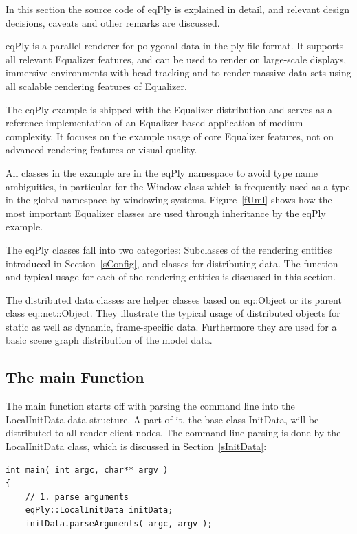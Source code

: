 \documentclass[10pt,a4]{scrartcl}
\newcommand{\fig}[1]{Figure~\ref{#1}}
\newcommand{\sref}[1]{Section~\ref{#1}}
\begin{document}
In this section the source code of \textsf{eqPly} is explained in
detail, and relevant design decisions, caveats and other remarks are
discussed.

\textsf{eqPly} is a parallel renderer for polygonal data in the
\textsf{ply} file format. It supports all relevant Equalizer features,
and can be used to render on large-scale displays, immersive
environments with head tracking and to render massive data sets using
all scalable rendering features of Equalizer.

The \textsf{eqPly} example is shipped with the Equalizer distribution
and serves as a reference implementation of an Equalizer-based
application of medium complexity. It focuses on the example usage of
core Equalizer features, not on advanced rendering features or visual
quality.

All classes in the example are in the \textsf{eqPly} namespace to avoid
type name ambiguities, in particular for the \textsf{Window} class which
is frequently used as a type in the global namespace by windowing
systems. \fig{fUml} shows how the most important Equalizer classes are
used through inheritance by the \textsf{eqPly} example.

The \textsf{eqPly} classes fall into two categories: Subclasses of the
rendering entities introduced in \sref{sConfig}, and classes for
distributing data. The function and typical usage for each of the
rendering entities is discussed in this section.

The distributed data classes are helper classes based on
\textsf{eq::Object} or its parent class \textsf{eq::net::Object}. They
illustrate the typical usage of distributed objects for static as well
as dynamic, frame-specific data. Furthermore they are used for a basic
scene graph distribution of the model data.


\subsection{The main Function}

The main function starts off with parsing the command line into the
\textsf{LocalInitData} data structure. A part of it, the base class
\textsf{InitData}, will be distributed to all render client nodes. The
command line parsing is done by the \textsf{LocalInitData} class, which
is discussed in \sref{sInitData}:

{\footnotesize\begin{lstlisting}
int main( int argc, char** argv )
{
    // 1. parse arguments
    eqPly::LocalInitData initData;
    initData.parseArguments( argc, argv );
\end{lstlisting}}
\end{document}
